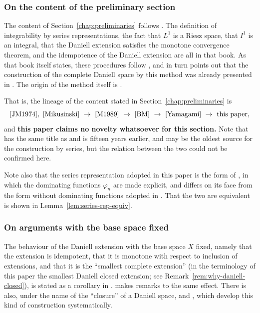 \subsubsection{On the content of the preliminary section}

The content of Section~\ref{chap:preliminaries} follows \cite{Yamagami}.
The definition of integrability by series representations, the fact that $L^1$ is
a Riesz space, that $I^1$ is an integral, that the Daniell extension satisfies
the monotone convergence theorem, and the idempotence of the Daniell extension
are all in that book.
As that book itself states, these procedures follow \cite{BM}, and \cite{BM} in
turn points out that the construction of the complete Daniell space by this
method was already presented in \cite{M1989}.
The origin of the method itself is \cite{Mikusinski}.

That is, the lineage of the content stated in
Section~\ref{chap:preliminaries} is
\[
  \text{\cite{JM1974}},\ \text{\cite{Mikusinski}}
  \ \to\ \text{\cite{M1989}}
  \ \to\ \text{\cite{BM}}
  \ \to\ \text{\cite{Yamagami}}
  \ \to\ \text{this paper} ,
\]
and \textbf{this paper claims no novelty whatsoever for this section.}
Note that \cite{JM1974} has the same title as \cite{M1989} and is fifteen years
earlier, and may be the oldest source for the construction by series, but the
relation between the two could not be confirmed here.

Note also that the series representation adopted in this paper is the form of
\cite{Yamagami}, in which the dominating functions $\varphi_n$ are made
explicit, and differs on its face from the form without dominating functions
adopted in \cite{BM}.
That the two are equivalent is shown in
Lemma~\ref{lem:series-rep-equiv}.

\subsubsection{On arguments with the base space fixed}

The behaviour of the Daniell extension with the base space $X$ fixed, namely
that the extension is idempotent, that it is monotone with respect to inclusion
of extensions, and that it is the ``smallest complete extension'' (in the
terminology of this paper the smallest Daniell closed extension; see
Remark~\ref{rem:why-daniell-closed}), is stated as a corollary in
\cite{Yamagami}.
\cite{BM} makes remarks to the same effect.
There is also, under the name of the ``closure'' of a Daniell space,
\cite{CWS} and \cite{CFW}, which develop this kind of construction
systematically.

